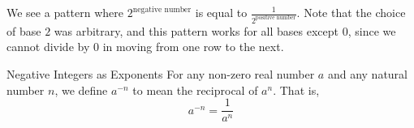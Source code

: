 \documentclass{ximera}
\begin{document}
  We see a pattern where $2^{\text{negative number}}$ is equal to $\frac{1}{2^{\text{positive number}}}$.
      Note that the choice of base $2$ was arbitrary,
      and this pattern works for all bases except $0$,
      since we cannot divide by $0$ in moving from one row to the next.

\begin{remark}
     Negative Integers as Exponents
          For any non-zero real number $a$ and any natural number $n$,
          we define $a^{-n}$ to mean the reciprocal of $a^n$. That is,
\[      
 a^{-n} = \frac{1}{a^n}
   \]
     
    \end{remark}
\end{document}
